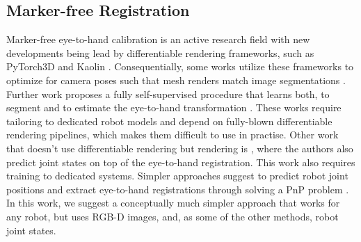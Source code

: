 \subsection{Marker-free Registration}
Marker-free eye-to-hand calibration is an active research field with new developments being lead by differentiable rendering frameworks, such as PyTorch3D \cite{ravi2020pytorch3d} and Kaolin \cite{KaolinLibrary}. Consequentially, some works utilize these frameworks to optimize for camera poses such that mesh renders match image segmentations \cite{chen2023easyhec}. Further work proposes a fully self-supervised procedure that learns both, to segment and to estimate the eye-to-hand transformation \cite{lu2023markerless}. These works require tailoring to dedicated robot models and depend on fully-blown differentiable rendering pipelines, which makes them difficult to use in practise. Other work that doesn't use differentiable rendering but rendering is \cite{labbe2021single}, where the authors also predict joint states on top of the eye-to-hand registration. This work also requires training to dedicated systems. Simpler approaches suggest to predict robot joint positions and extract eye-to-hand registrations through solving a PnP problem \cite{lee2020camera}. In this work, we suggest a conceptually much simpler approach that works for any robot, but uses RGB-D images, and, as some of the other methods, robot joint states.

